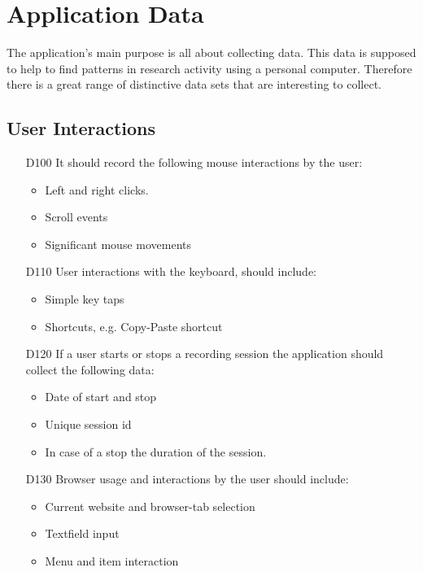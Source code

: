 \chapter{Application Data}
\label{ch:data}

The application's main purpose is all about collecting data. This data is supposed to help to find patterns in research activity using a personal computer. Therefore there is a great range of distinctive data sets that are interesting to collect.

\section{User Interactions}
\begin{itemize}
\item[D100] It should record the following mouse interactions by the user:
	\begin{itemize}
	\item Left and right clicks.
	\item Scroll events
	\item Significant mouse movements
	\end{itemize}

\item[D110] User interactions with the keyboard, should include:
	\begin{itemize}
	\item Simple key taps
	\item Shortcuts, e.g. Copy-Paste shortcut
	\end{itemize}

\item[D120] If a user starts or stops a recording session the application should collect the following data:
	\begin{itemize}
	\item Date of start and stop
	\item Unique session id
	\item In case of a stop the duration of the session.
	\end{itemize}

\item[D130] Browser usage and interactions by the user should include:
	\begin{itemize}
	\item Current website and browser-tab selection
	\item Textfield input
	\item Menu and item interaction
	\end{itemize}
\end{itemize}

